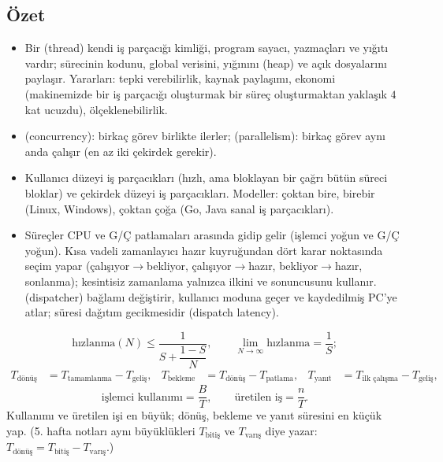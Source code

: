 \subsection*{Özet}
\begin{itemize}
  \item Bir  (thread) kendi iş parçacığı kimliği, program sayacı, yazmaçları ve yığıtı vardır; sürecinin kodunu, global verisini, yığınını (heap) ve açık dosyalarını paylaşır. Yararları: tepki verebilirlik, kaynak paylaşımı, ekonomi (makinemizde bir iş parçacığı oluşturmak bir süreç oluşturmaktan yaklaşık $4$ kat ucuzdu), ölçeklenebilirlik.
  \item {} (concurrency): birkaç görev birlikte ilerler;  (parallelism): birkaç görev aynı anda çalışır (en az iki çekirdek gerekir).
  \item Kullanıcı düzeyi iş parçacıkları (hızlı, ama bloklayan bir çağrı bütün süreci bloklar) ve çekirdek düzeyi iş parçacıkları. Modeller: çoktan bire, birebir (Linux, Windows), çoktan çoğa (Go, Java sanal iş parçacıkları).
  \item Süreçler CPU ve G/Ç patlamaları arasında gidip gelir (işlemci yoğun ve G/Ç yoğun). Kısa vadeli zamanlayıcı hazır kuyruğundan dört karar noktasında seçim yapar (çalışıyor$\to$bekliyor, çalışıyor$\to$hazır, bekliyor$\to$hazır, sonlanma); kesintisiz zamanlama yalnızca ilkini ve sonuncusunu kullanır.  (dispatcher) bağlamı değiştirir, kullanıcı moduna geçer ve kaydedilmiş PC'ye atlar; süresi dağıtım gecikmesidir (dispatch latency).
\end{itemize}

\begin{keyidea}
\[
\text{hızlanma}(N) \le \frac{1}{S + \dfrac{1-S}{N}}, \qquad \lim_{N\to\infty} \text{hızlanma} = \frac{1}{S};
\]
\begin{align*}
T_{\text{dönüş}} &= T_{\text{tamamlanma}} - T_{\text{geliş}}, &
T_{\text{bekleme}} &= T_{\text{dönüş}} - T_{\text{patlama}}, &
T_{\text{yanıt}} &= T_{\text{ilk çalışma}} - T_{\text{geliş}},
\end{align*}
\[
\text{işlemci kullanımı} = \frac{B}{T}, \qquad \text{üretilen iş} = \frac{n}{T}.
\]
Kullanımı ve üretilen işi en büyük; dönüş, bekleme ve yanıt süresini en küçük yap. (5. hafta notları aynı büyüklükleri $T_{\text{bitiş}}$ ve $T_{\text{varış}}$ diye yazar: $T_{\text{dönüş}} = T_{\text{bitiş}} - T_{\text{varış}}$.)
\end{keyidea}

